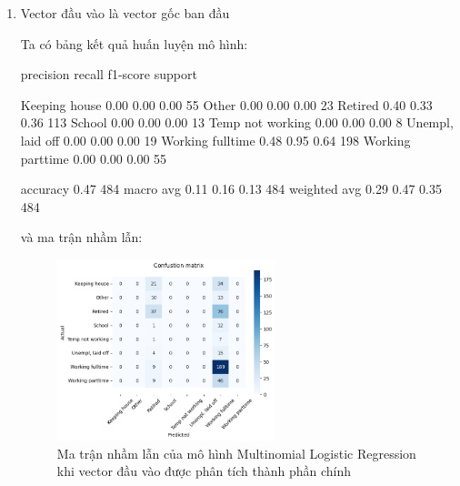 \begin{enumerate}[label=(\alph*)]
    \item Vector đầu vào là vector gốc ban đầu
    
    Ta có bảng kết quả huấn luyện mô hình:

    \begin{python}
                    precision    recall  f1-score   support

   Keeping house       0.00      0.00      0.00        55
           Other       0.00      0.00      0.00        23
         Retired       0.40      0.33      0.36       113
          School       0.00      0.00      0.00        13
Temp not working       0.00      0.00      0.00         8
Unempl, laid off       0.00      0.00      0.00        19
Working fulltime       0.48      0.95      0.64       198
Working parttime       0.00      0.00      0.00        55

        accuracy                           0.47       484
       macro avg       0.11      0.16      0.13       484
    weighted avg       0.29      0.47      0.35       484
    \end{python}

    và ma trận nhầm lẫn:

    \begin{figure}[H]
        \centering
        \includegraphics[width=0.6\textwidth]{figures/Thanh/Models/Random_Forest/With_null_models_confusion_matrix_Random_Forest_original_features.png}
        \caption{Ma trận nhầm lẫn của mô hình Multinomial Logistic Regression khi vector đầu vào được phân tích thành phần chính}
        \label{fig:With_null_models_confusion_matrix_Random_Forest_original_features}
    \end{figure}
    

\end{enumerate}
